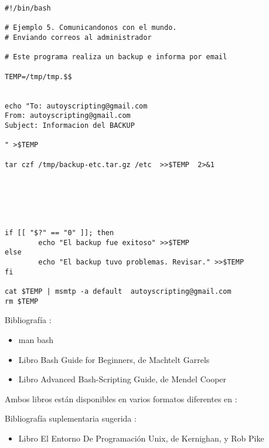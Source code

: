 \documentclass{beamer}
\begin{document}
\begin{Verbatim}
#!/bin/bash

# Ejemplo 5. Comunicandonos con el mundo.
# Enviando correos al administrador

# Este programa realiza un backup e informa por email

TEMP=/tmp/tmp.$$


echo "To: autoyscripting@gmail.com
From: autoyscripting@gmail.com
Subject: Informacion del BACKUP

" >$TEMP

tar czf /tmp/backup-etc.tar.gz /etc  >>$TEMP  2>&1






if [[ "$?" == "0" ]]; then
        echo "El backup fue exitoso" >>$TEMP
else
        echo "El backup tuvo problemas. Revisar." >>$TEMP
fi

cat $TEMP | msmtp -a default  autoyscripting@gmail.com
rm $TEMP

\end{Verbatim}



\begin{frame}
Bibliografía : 
\begin{itemize}
\item man bash
\item Libro Bash Guide for Beginners, de Machtelt Garrels 
\item Libro Advanced Bash-Scripting Guide, de Mendel Cooper
\end{itemize}

Ambos libros están disponibles en varios formatos diferentes en :

Bibliografía suplementaria sugerida : 
\begin{itemize}
\item Libro El Entorno De Programación Unix, de Kernighan, y Rob Pike
\end{itemize}

\end{frame}
\end{document}

